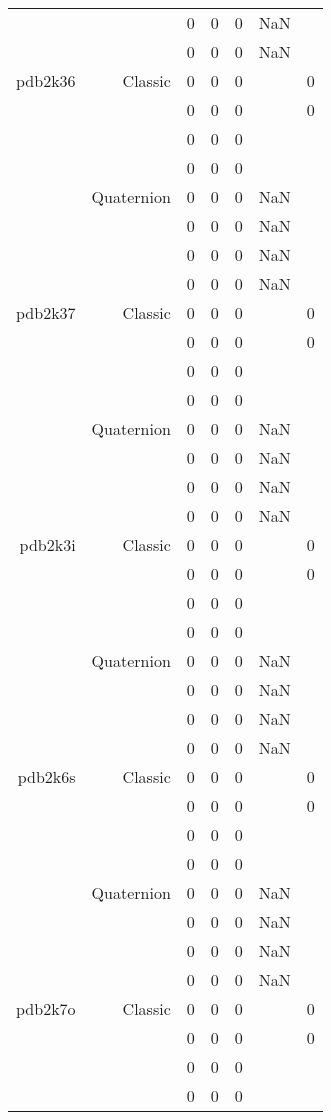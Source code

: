 \begin{xltabular}{\textwidth}{r|rcccSc}
& & 0 & 0 & 0 & NaN & \\
& & 0 & 0 & 0 & NaN & \\ \addlinespace
pdb2k36 & Classic & 0 & 0 & 0 & & 0 \\
& & 0 & 0 & 0 & & 0 \\
& & 0 & 0 & 0 & & \\
& & 0 & 0 & 0 & & \\
& Quaternion & 0 & 0 & 0 & NaN & \\
& & 0 & 0 & 0 & NaN & \\
& & 0 & 0 & 0 & NaN & \\
& & 0 & 0 & 0 & NaN & \\ \addlinespace
pdb2k37 & Classic & 0 & 0 & 0 & & 0 \\
& & 0 & 0 & 0 & & 0 \\
& & 0 & 0 & 0 & & \\
& & 0 & 0 & 0 & & \\
& Quaternion & 0 & 0 & 0 & NaN & \\
& & 0 & 0 & 0 & NaN & \\
& & 0 & 0 & 0 & NaN & \\
& & 0 & 0 & 0 & NaN & \\ \addlinespace
pdb2k3i & Classic & 0 & 0 & 0 & & 0 \\
& & 0 & 0 & 0 & & 0 \\
& & 0 & 0 & 0 & & \\
& & 0 & 0 & 0 & & \\
& Quaternion & 0 & 0 & 0 & NaN & \\
& & 0 & 0 & 0 & NaN & \\
& & 0 & 0 & 0 & NaN & \\
& & 0 & 0 & 0 & NaN & \\ \addlinespace
pdb2k6s & Classic & 0 & 0 & 0 & & 0 \\
& & 0 & 0 & 0 & & 0 \\
& & 0 & 0 & 0 & & \\
& & 0 & 0 & 0 & & \\
& Quaternion & 0 & 0 & 0 & NaN & \\
& & 0 & 0 & 0 & NaN & \\
& & 0 & 0 & 0 & NaN & \\
& & 0 & 0 & 0 & NaN & \\ \addlinespace
pdb2k7o & Classic & 0 & 0 & 0 & & 0 \\
& & 0 & 0 & 0 & & 0 \\
& & 0 & 0 & 0 & & \\
& & 0 & 0 & 0 & & \\

\end{xltabular}
